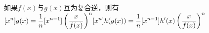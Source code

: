 如果$f(x)$与$g(x)$互为复合逆，则有 \\
\begin{math}
\begin{aligned}[x^n]g(x)=\frac{1}{n}[x^{n-1}]\left(\frac{x}{f(x)}\right)^n\end{aligned} \\
\begin{aligned}[x^n]h(g(x))=\frac{1}{n}[x^{n-1}]h'(x)\left(\frac{x}{f(x)}\right)^n\end{aligned}
\end{math}